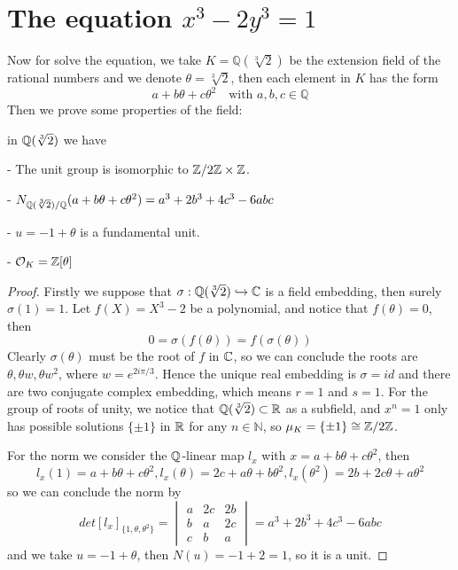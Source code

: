 \section{The equation $x^3-2y^3=1$}
Now for solve the equation, we take \(K = \mathbb{Q}(\sqrt[3]{2})\) be the extension field of the rational numbers and we denote \(\theta = \sqrt[3]{2}\), then each element in \(K\) has the form
\[a+b\theta +c \theta^2 \quad  \text{with } a,b,c  \in \mathbb{Q}\]
Then we prove some properties of the field:
\begin{proposition} \label{qqsqrt}
    in \(\mathbb{Q}(\sqrt[3]{2})\) we have

    - The unit group is isomorphic to \(\mathbb{Z}/2\mathbb{Z} \times \mathbb{Z}\).

    - \(N_{\mathbb{Q}(\sqrt[3]{2}) / \mathbb{Q}}(a+b\theta+c\theta^2) = a^3+2b^3+4c^3-6abc\)

    - \(u = -1 + \theta \) is a fundamental unit.

    - \(\mathcal{O}_K = \mathbb{Z}[\theta]\)


    \begin{proof}
        Firstly we suppose that \(\sigma: \mathbb{Q}(\sqrt[3]{2}) \hookrightarrow  \mathbb{C} \) is a field embedding, then surely \(\sigma(1)=1\). Let \(f(X) = X^3-2\) be a polynomial, and notice that \(f(\theta) = 0\), then
        \[0 = \sigma(f(\theta)) = f(\sigma(\theta))\]
        Clearly \(\sigma(\theta)\) must be the root of \(f\) in \(\mathbb{C}\), so we can conclude the roots are \(\theta, \theta w , \theta w^2\), where \(w = e^{2i\pi /3}\). Hence the unique real embedding is \(\sigma=id\) and there are two conjugate complex embedding, which means \(r=1\) and \(s=1\). For the group of roots of unity, we notice that \(\mathbb{Q}(\sqrt[3]{2}) \subset \mathbb{R}\) as a subfield, and \(x^n=1\) only has possible solutions \(\{\pm 1\}\) in \(\mathbb{R}\) for any \(n \in \mathbb{N}\), so \(\mu_K = \{\pm 1\} \cong \mathbb{Z}/2\mathbb{Z}\).

        For the norm we consider the \(\mathbb{Q}\)-linear map \(l_x\) with \(x=a+b \theta + c \theta^2\), then
        \[l_x(1) = a+b \theta + c \theta^2, l_x(\theta )= 2c+a \theta + b \theta ^2, l_x(\theta ^2) = 2b+ 2c \theta + a \theta ^2 \]
        so we can conclude the norm by 
        \[det{[l_x]_{\{1,\theta,\theta ^2\}}} = \begin{vmatrix}
            a & 2c & 2b \\
            b & a & 2c \\
            c & b & a
        \end{vmatrix} = a^3+2b^3+4c^3-6abc\]
        and we take \(u= -1 + \theta\), then \(N(u) = -1+2=1\), so it is a unit.


\end{proof}
\end{proposition}
